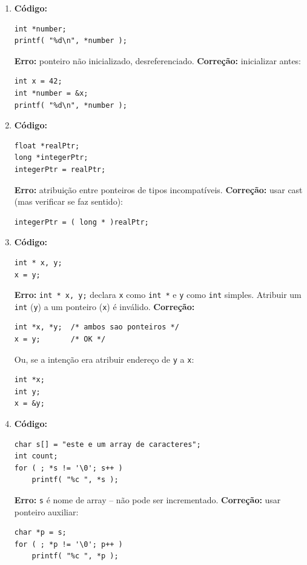 \documentclass[12pt,a4paper]{article}
\begin{document}
\begin{respostabox}
\begin{enumerate}[label=\textbf{\alph*)}]

\item \textbf{Código:}
\begin{lstlisting}
int *number;
printf( "%d\n", *number );
\end{lstlisting}
\textbf{Erro:} ponteiro não inicializado, desreferenciado.
\textbf{Correção:} inicializar antes:
\begin{lstlisting}
int x = 42;
int *number = &x;
printf( "%d\n", *number );
\end{lstlisting}

\item \textbf{Código:}
\begin{lstlisting}
float *realPtr;
long *integerPtr;
integerPtr = realPtr;
\end{lstlisting}
\textbf{Erro:} atribuição entre ponteiros de tipos incompatíveis.
\textbf{Correção:} usar cast (mas verificar se faz sentido):
\begin{lstlisting}
integerPtr = ( long * )realPtr;
\end{lstlisting}

\item \textbf{Código:}
\begin{lstlisting}
int * x, y;
x = y;
\end{lstlisting}
\textbf{Erro:} \texttt{int * x, y;} declara \texttt{x} como \texttt{int *} e
\texttt{y} como \texttt{int} simples. Atribuir um \texttt{int} (\texttt{y}) a um
ponteiro (\texttt{x}) é inválido.
\textbf{Correção:}
\begin{lstlisting}
int *x, *y;  /* ambos sao ponteiros */
x = y;       /* OK */
\end{lstlisting}
Ou, se a intenção era atribuir endereço de \texttt{y} a \texttt{x}:
\begin{lstlisting}
int *x;
int y;
x = &y;
\end{lstlisting}

\item \textbf{Código:}
\begin{lstlisting}
char s[] = "este e um array de caracteres";
int count;
for ( ; *s != '\0'; s++ )
    printf( "%c ", *s );
\end{lstlisting}
\textbf{Erro:} \texttt{s} é nome de array -- não pode ser incrementado.
\textbf{Correção:} usar ponteiro auxiliar:
\begin{lstlisting}
char *p = s;
for ( ; *p != '\0'; p++ )
    printf( "%c ", *p );
\end{lstlisting}


\end{enumerate}
\end{respostabox}
\end{document}
